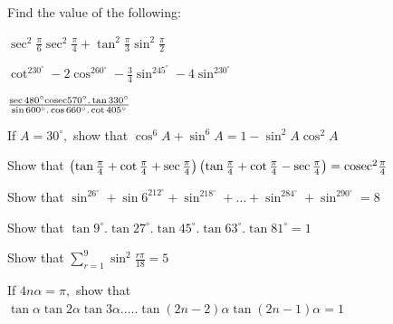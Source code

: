 Find the value of the following:
\item $\sec^2\frac{\pi}{6}\sec^2\frac{\pi}{4} + \tan^2\frac{\pi}{3}\sin^2\frac{\pi}{2}$
\item $\cot^230^\circ - 2\cos^260^\circ - \frac{3}{4}\sin^245^\circ - 4\sin^230^\circ$
\item $\frac{\sec 480^\circ{\rm cosec}570^\circ.\tan 330^\circ}{\sin 600^\circ.\cos 660^\circ.\cot 405^\circ}$
\item If $A = 30^\circ,$ show that $\cos^6A + \sin^6A = 1 - \sin^2A\cos^2A$
\item Show that $\left(\tan \frac{\pi}{4} + \cot \frac{\pi}{4} + \sec\frac{\pi}{4}\right)\left(\tan \frac{\pi}{4} + \cot
    \frac{\pi}{4} - \sec \frac{\pi}{4}\right) = {\rm cosec}^2 \frac{\pi}{4}$
\item Show that $\sin^26^\circ + \sin6^212^\circ + \sin^218^\circ + \ldots + \sin^284^\circ + \sin^290^\circ = 8$
\item Show that $\tan 9^\circ.\tan 27^\circ.\tan 45^\circ.\tan 63^\circ.\tan 81^\circ = 1$
\item Show that $\sum_{r = 1}^9 \sin^2\frac{r\pi}{18} = 5$
\item If $4n\alpha = \pi,$ show that $\tan\alpha\tan2\alpha\tan3\alpha. \ldots .\tan(2n - 2)\alpha\tan(2n - 1)\alpha = 1$
\stopitemize

